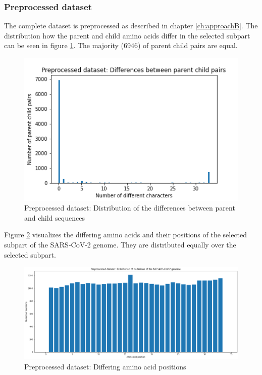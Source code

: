 \subsubsection{Preprocessed dataset}  \label{ch:experimentsAb}

The complete dataset is preprocessed as described in chapter \ref{ch:approachB}.
The distribution how the parent and child amino acids differ in the selected subpart can be seen in figure \ref{preprocessedDistributionDifferencesParentChild}. The majority (6946) of parent child pairs are equal.

\begin{figure}[ht]
	\centering
	\includegraphics[width=0.7\linewidth]{figures/preprocessedDistributionDifferencesParentChild.png}
	\caption{Preprocessed dataset: Distribution of the differences between parent and child sequences \cite{own representation}}
	\label{preprocessedDistributionDifferencesParentChild}
\end{figure}

Figure \ref{preprocessedMutatedGeneticLoci} visualizes the differing amino acids and their positions of the selected subpart of the \ac{SARS-CoV-2} genome. They are distributed equally over the selected subpart.

\begin{figure}[ht]
	\centering
	\includegraphics[width=1.0\linewidth]{figures/preprocessedMutatedGeneticLoci.png}
	\caption{Preprocessed dataset: Differing amino acid positions \cite{own representation}}
	\label{preprocessedMutatedGeneticLoci}
\end{figure}

